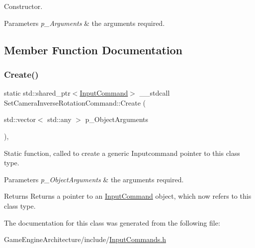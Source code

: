 Constructor. 


\begin{DoxyParams}{Parameters}
{\em p\+\_\+\+Arguments} & the arguments required. \\
\hline
\end{DoxyParams}


\subsection{Member Function Documentation}
\mbox{\label{class_set_camera_inverse_rotation_command_a7daafaddb1cb608a10ecb5528127d214}} 
\subsubsection{\texorpdfstring{Create()}{Create()}}
{\footnotesize\ttfamily static std\+::shared\+\_\+ptr$<$\mbox{\hyperlink{class_input_command}{Input\+Command}}$>$ \+\_\+\+\_\+stdcall Set\+Camera\+Inverse\+Rotation\+Command\+::\+Create (\begin{DoxyParamCaption}\item[{std\+::vector$<$ std\+::any $>$}]{p\+\_\+\+Object\+Arguments }\end{DoxyParamCaption})\hspace{0.3cm}{\ttfamily [inline]}, {\ttfamily [static]}}



Static function, called to create a generic Inputcommand pointer to this class type. 


\begin{DoxyParams}{Parameters}
{\em p\+\_\+\+Object\+Arguments} & the arguments required. \\
\hline
\end{DoxyParams}
\begin{DoxyReturn}{Returns}
Returns a pointer to an \mbox{\hyperlink{class_input_command}{Input\+Command}} object, which now refers to this class type. 
\end{DoxyReturn}


The documentation for this class was generated from the following file\+:\begin{DoxyCompactItemize}
\item 
Game\+Engine\+Architecture/include/\mbox{\hyperlink{_input_commands_8h}{Input\+Commands.\+h}}\end{DoxyCompactItemize}
